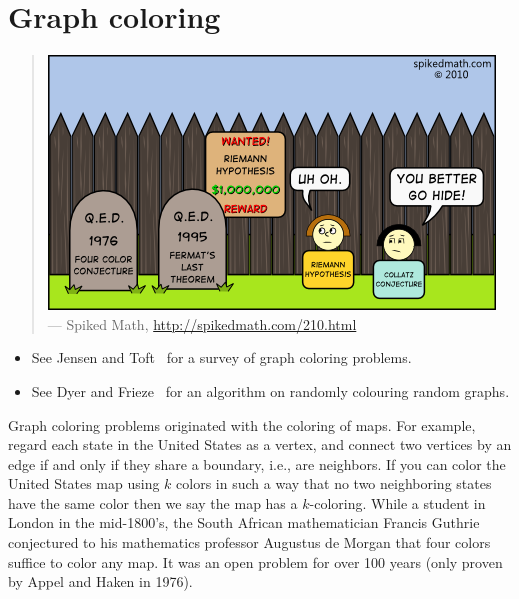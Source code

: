 
\chapter{Graph coloring}
\label{chap:graph_coloring}

\begin{quote}
\includegraphics[scale=1.0]{image/graph-coloring/four-color-conjecture-qed} \\
\noindent
--- Spiked Math,
\url{http://spikedmath.com/210.html}
\end{quote}

\begin{itemize}
\item See Jensen and Toft~\cite{JensenToft1995} for a survey of graph
  coloring problems.

\item See Dyer and Frieze~\cite{DyerFrieze2010} for an algorithm on
  randomly colouring random graphs.
\end{itemize}


Graph coloring problems originated with the coloring of maps.
For example, regard each state in the United States as a vertex,
and connect two vertices by an edge if and only if they share
a boundary, i.e., are neighbors. If you can color the United States
map using $k$ colors in such a way that no two neighboring states have the
same color then we say the map has a $k$-coloring.
While a student in London in the mid-1800's, the South African mathematician
Francis Guthrie conjectured to his mathematics professor
Augustus de Morgan that four colors suffice to color any map.
It was an open problem for over 100 years (only proven by Appel
and Haken in 1976).


